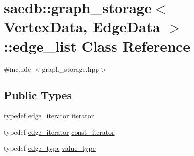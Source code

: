 \hypertarget{classsaedb_1_1graph__storage_1_1edge__list}{\section{saedb\-:\-:graph\-\_\-storage$<$ Vertex\-Data, Edge\-Data $>$\-:\-:edge\-\_\-list Class Reference}
\label{d3/d38/classsaedb_1_1graph__storage_1_1edge__list}
}


{\ttfamily \#include $<$graph\-\_\-storage.\-hpp$>$}

\subsection*{Public Types}
\begin{DoxyCompactItemize}
\item 
typedef \hyperlink{classsaedb_1_1graph__storage_1_1edge__iterator}{edge\-\_\-iterator} \hyperlink{classsaedb_1_1graph__storage_1_1edge__list_ad2b3368008717c7522cdc2b461e7d35a}{iterator}
\item 
typedef \hyperlink{classsaedb_1_1graph__storage_1_1edge__iterator}{edge\-\_\-iterator} \hyperlink{classsaedb_1_1graph__storage_1_1edge__list_a830dd554e74e9322240247109b704635}{const\-\_\-iterator}
\item 
typedef \hyperlink{classsaedb_1_1graph__storage_1_1edge__type}{edge\-\_\-type} \hyperlink{classsaedb_1_1graph__storage_1_1edge__list_a5ee589042b74f82446a17c08a8e7813f}{value\-\_\-type}
\end{DoxyCompactItemize}
